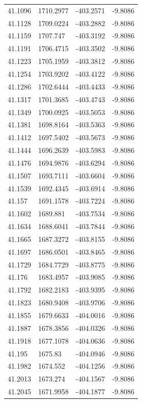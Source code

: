 \begin{table}[H]
\begin{tabular}{llll}
41.1096 & 1710.2977 & -403.2571 & -9.8086 \\
41.1128 & 1709.0224 & -403.2882 & -9.8086 \\
41.1159 & 1707.747 & -403.3192 & -9.8086 \\
41.1191 & 1706.4715 & -403.3502 & -9.8086 \\
41.1223 & 1705.1959 & -403.3812 & -9.8086 \\
41.1254 & 1703.9202 & -403.4122 & -9.8086 \\
41.1286 & 1702.6444 & -403.4433 & -9.8086 \\
41.1317 & 1701.3685 & -403.4743 & -9.8086 \\
41.1349 & 1700.0925 & -403.5053 & -9.8086 \\
41.1381 & 1698.8164 & -403.5363 & -9.8086 \\
41.1412 & 1697.5402 & -403.5673 & -9.8086 \\
41.1444 & 1696.2639 & -403.5983 & -9.8086 \\
41.1476 & 1694.9876 & -403.6294 & -9.8086 \\
41.1507 & 1693.7111 & -403.6604 & -9.8086 \\
41.1539 & 1692.4345 & -403.6914 & -9.8086 \\
41.157 & 1691.1578 & -403.7224 & -9.8086 \\
41.1602 & 1689.881 & -403.7534 & -9.8086 \\
41.1634 & 1688.6041 & -403.7844 & -9.8086 \\
41.1665 & 1687.3272 & -403.8155 & -9.8086 \\
41.1697 & 1686.0501 & -403.8465 & -9.8086 \\
41.1729 & 1684.7729 & -403.8775 & -9.8086 \\
41.176 & 1683.4957 & -403.9085 & -9.8086 \\
41.1792 & 1682.2183 & -403.9395 & -9.8086 \\
41.1823 & 1680.9408 & -403.9706 & -9.8086 \\
41.1855 & 1679.6633 & -404.0016 & -9.8086 \\
41.1887 & 1678.3856 & -404.0326 & -9.8086 \\
41.1918 & 1677.1078 & -404.0636 & -9.8086 \\
41.195 & 1675.83 & -404.0946 & -9.8086 \\
41.1982 & 1674.552 & -404.1256 & -9.8086 \\
41.2013 & 1673.274 & -404.1567 & -9.8086 \\
41.2045 & 1671.9958 & -404.1877 & -9.8086 \\

\end{tabular}
\end{table}
